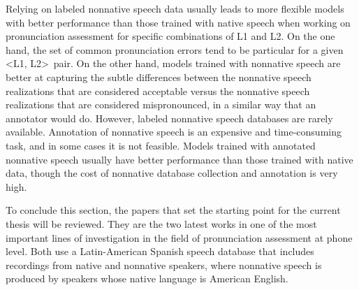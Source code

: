 Relying on labeled nonnative speech data usually leads to more flexible models
with better performance than those trained with native speech
when working on pronunciation assessment for specific combinations of L1 and L2. On the one hand,
the set of common pronunciation errors tend to be particular for a given \textless L1, L2\textgreater \ pair. On the other hand, models trained
with nonnative speech are better at capturing the subtle differences between the nonnative
speech realizations that are considered acceptable versus the nonnative speech realizations
that are considered mispronounced, in a similar way that an annotator would do.
However, labeled nonnative speech databases are rarely available. Annotation
of nonnative speech is an expensive and time-consuming task, and in some cases it is not feasible.
Models trained with annotated nonnative speech usually have better performance
than those trained with native data, though the cost of nonnative database
collection and annotation is very high.

To conclude this section, the papers that set the starting point for the current thesis will
be reviewed. They are the two latest works in one of the most important lines of investigation
in the field of pronunciation assessment at phone level.
Both use a Latin-American Spanish speech database that includes recordings from
native and nonnative speakers, where nonnative speech
is produced by speakers whose native language is American English.

